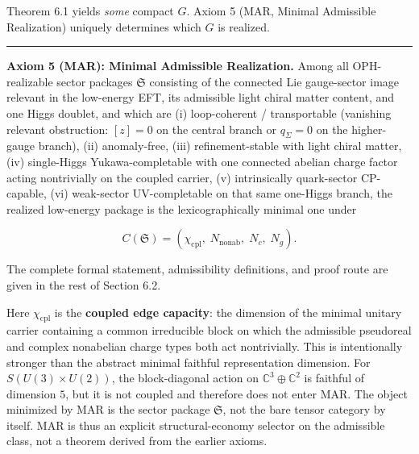 Theorem 6.1 yields \emph{some} compact \(G\). Axiom 5 (MAR, Minimal Admissible Realization) uniquely determines which \(G\) is realized.

\begin{center}\rule{0.5\linewidth}{0.5pt}\end{center}

\textbf{Axiom 5 (MAR): Minimal Admissible Realization.} Among all OPH-realizable sector packages \(\mathfrak S\) consisting of the connected Lie gauge-sector image relevant in the low-energy EFT, its admissible light chiral matter content, and one Higgs doublet, and which are (i) loop-coherent / transportable (vanishing relevant obstruction: \([z]=0\) on the central branch or \(q_\Sigma=0\) on the higher-gauge branch), (ii) anomaly-free, (iii) refinement-stable with light chiral matter, (iv) single-Higgs Yukawa-completable with one connected abelian charge factor acting nontrivially on the coupled carrier, (v) intrinsically quark-sector CP-capable, (vi) weak-sector UV-completable on that same one-Higgs branch, the realized low-energy package is the lexicographically minimal one under

\[C(\mathfrak S) = (\chi_{\mathrm{cpl}},\; N_{\mathrm{nonab}},\; N_c,\; N_g).\]

The complete formal statement, admissibility definitions, and proof route are given in the rest of Section 6.2.

Here \(\chi_{\mathrm{cpl}}\) is the \textbf{coupled edge capacity}: the dimension of the minimal unitary carrier containing a common irreducible block on which the admissible pseudoreal and complex nonabelian charge types both act nontrivially. This is intentionally stronger than the abstract minimal faithful representation dimension. For \(S(U(3)\times U(2))\), the block-diagonal action on \(\mathbb{C}^3 \oplus \mathbb{C}^2\) is faithful of dimension \(5\), but it is not coupled and therefore does not enter MAR. The object minimized by MAR is the sector package \(\mathfrak S\), not the bare tensor category by itself. MAR is thus an explicit structural-economy selector on the admissible class, not a theorem derived from the earlier axioms.

